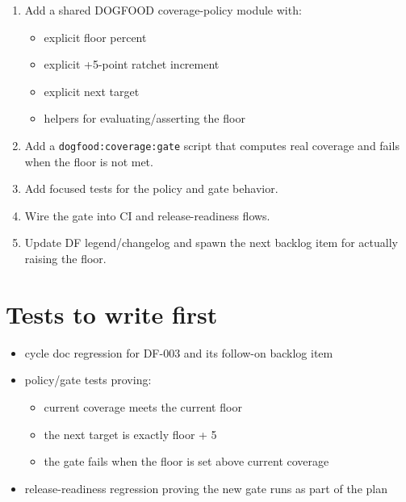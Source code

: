 \begin{enumerate}
\def\labelenumi{\arabic{enumi}.}
\tightlist
\item
  Add a shared DOGFOOD coverage-policy module with:

  \begin{itemize}
  \tightlist
  \item
    explicit floor percent
  \item
    explicit +5-point ratchet increment
  \item
    explicit next target
  \item
    helpers for evaluating/asserting the floor
  \end{itemize}
\item
  Add a \texttt{d\allowbreak{}o\allowbreak{}g\allowbreak{}f\allowbreak{}o\allowbreak{}o\allowbreak{}d\allowbreak{}:\allowbreak{}c\allowbreak{}o\allowbreak{}v\allowbreak{}e\allowbreak{}r\allowbreak{}a\allowbreak{}g\allowbreak{}e\allowbreak{}:\allowbreak{}g\allowbreak{}a\allowbreak{}t\allowbreak{}e} script that computes real coverage and fails when the floor is not met.
\item
  Add focused tests for the policy and gate behavior.
\item
  Wire the gate into CI and release-readiness flows.
\item
  Update DF legend/changelog and spawn the next backlog item for actually raising the floor.
\end{enumerate}

\section{Tests to write first}\label{record-065-tests-to-write-first}

\begin{itemize}
\tightlist
\item
  cycle doc regression for DF-003 and its follow-on backlog item
\item
  policy/gate tests proving:

  \begin{itemize}
  \tightlist
  \item
    current coverage meets the current floor
  \item
    the next target is exactly floor + 5
  \item
    the gate fails when the floor is set above current coverage
  \end{itemize}
\item
  release-readiness regression proving the new gate runs as part of the plan
\end{itemize}

